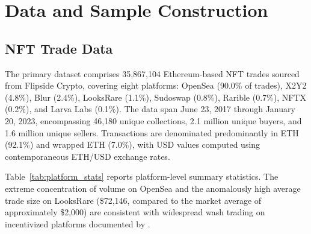 \documentclass[12pt,a4paper]{article}
\begin{document}

\section{Data and Sample Construction}\label{sec:data}

\subsection{NFT Trade Data}

The primary dataset comprises 35,867,104 Ethereum-based NFT trades sourced from Flipside Crypto, covering eight platforms: OpenSea (90.0\% of trades), X2Y2 (4.8\%), Blur (2.4\%), LooksRare (1.1\%), Sudoswap (0.8\%), Rarible (0.7\%), NFTX (0.2\%), and Larva Labs (0.1\%). The data span June 23, 2017 through January 20, 2023, encompassing 46,180 unique collections, 2.1 million unique buyers, and 1.6 million unique sellers. Transactions are denominated predominantly in ETH (92.1\%) and wrapped ETH (7.0\%), with USD values computed using contemporaneous ETH/USD exchange rates.

Table~\ref{tab:platform_stats} reports platform-level summary statistics. The extreme concentration of volume on OpenSea and the anomalously high average trade size on LooksRare (\$72,146, compared to the market average of approximately \$2,000) are consistent with widespread wash trading on incentivized platforms documented by \citet{VonWachterJensenRegner2022}.
\end{document}
